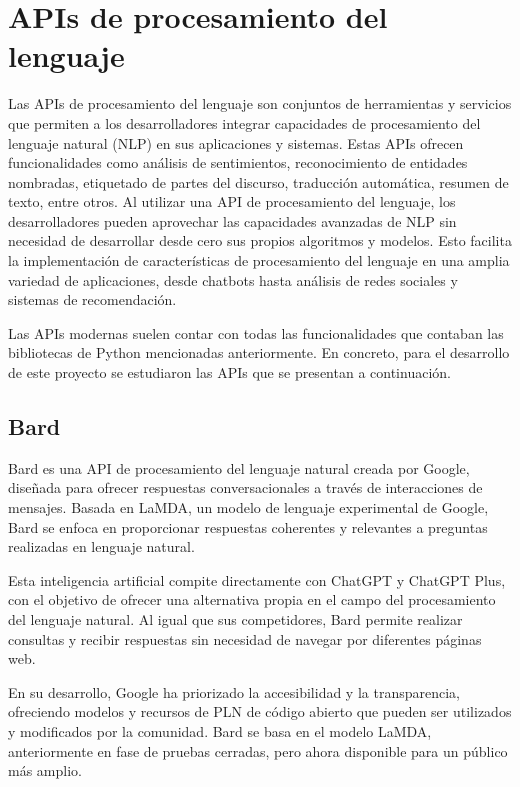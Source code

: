 \section{APIs de procesamiento del lenguaje}

Las APIs de procesamiento del lenguaje son conjuntos de herramientas y servicios que permiten a los desarrolladores integrar capacidades de procesamiento del lenguaje natural (NLP) en sus aplicaciones y sistemas. Estas APIs ofrecen funcionalidades como análisis de sentimientos, reconocimiento de entidades nombradas, etiquetado de partes del discurso, traducción automática, resumen de texto, entre otros. Al utilizar una API de procesamiento del lenguaje, los desarrolladores pueden aprovechar las capacidades avanzadas de NLP sin necesidad de desarrollar desde cero sus propios algoritmos y modelos. Esto facilita la implementación de características de procesamiento del lenguaje en una amplia variedad de aplicaciones, desde chatbots hasta análisis de redes sociales y sistemas de recomendación.

Las APIs modernas suelen contar con todas las funcionalidades que contaban las bibliotecas de Python mencionadas anteriormente. En concreto, para el desarrollo de este proyecto se estudiaron las APIs que se presentan a continuación.

\subsection{Bard}
Bard es una API de procesamiento del lenguaje natural creada por Google, diseñada para ofrecer respuestas conversacionales a través de interacciones de mensajes. Basada en LaMDA, un modelo de lenguaje experimental de Google, Bard se enfoca en proporcionar respuestas coherentes y relevantes a preguntas realizadas en lenguaje natural.

Esta inteligencia artificial compite directamente con ChatGPT y ChatGPT Plus, con el objetivo de ofrecer una alternativa propia en el campo del procesamiento del lenguaje natural. Al igual que sus competidores, Bard permite realizar consultas y recibir respuestas sin necesidad de navegar por diferentes páginas web.

En su desarrollo, Google ha priorizado la accesibilidad y la transparencia, ofreciendo modelos y recursos de PLN de código abierto que pueden ser utilizados y modificados por la comunidad. Bard se basa en el modelo LaMDA, anteriormente en fase de pruebas cerradas, pero ahora disponible para un público más amplio.

